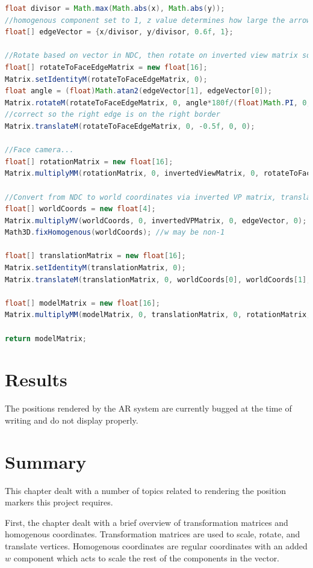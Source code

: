 \begin{lstlisting}[language=Java]
float divisor = Math.max(Math.abs(x), Math.abs(y));
//homogenous component set to 1, z value determines how large the arrow is later
float[] edgeVector = {x/divisor, y/divisor, 0.6f, 1}; 

//Rotate based on vector in NDC, then rotate on inverted view matrix so it faces the camera
float[] rotateToFaceEdgeMatrix = new float[16];
Matrix.setIdentityM(rotateToFaceEdgeMatrix, 0);
float angle = (float)Math.atan2(edgeVector[1], edgeVector[0]);
Matrix.rotateM(rotateToFaceEdgeMatrix, 0, angle*180f/(float)Math.PI, 0, 0, 1f);
//correct so the right edge is on the right border
Matrix.translateM(rotateToFaceEdgeMatrix, 0, -0.5f, 0, 0); 

//Face camera...
float[] rotationMatrix = new float[16];
Matrix.multiplyMM(rotationMatrix, 0, invertedViewMatrix, 0, rotateToFaceEdgeMatrix, 0);

//Convert from NDC to world coordinates via inverted VP matrix, translate matrix to that
float[] worldCoords = new float[4];
Matrix.multiplyMV(worldCoords, 0, invertedVPMatrix, 0, edgeVector, 0);
Math3D.fixHomogenous(worldCoords); //w may be non-1

float[] translationMatrix = new float[16];
Matrix.setIdentityM(translationMatrix, 0);
Matrix.translateM(translationMatrix, 0, worldCoords[0], worldCoords[1], worldCoords[2]);

float[] modelMatrix = new float[16];
Matrix.multiplyMM(modelMatrix, 0, translationMatrix, 0, rotationMatrix, 0);

return modelMatrix;
\end{lstlisting}

\section{Results}
The positions rendered by the AR system are currently bugged at the time of writing and do not display properly.

\section{Summary}
This chapter dealt with a number of topics related to rendering the position markers this project requires.

First, the chapter dealt with a brief overview of transformation matrices and homogenous coordinates. Transformation matrices are used to scale, rotate, and translate vertices. Homogenous coordinates are regular coordinates with an added $w$ component which acts to scale the rest of the components in the vector.

